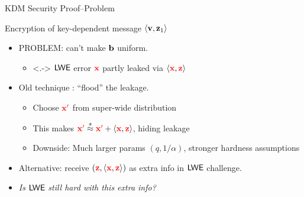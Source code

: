 \begin{frame}{KDM Security Proof--Problem}
  \begin{block}{Encryption of key-dependent message $\langle{\ensuremath{\mathbf{v}},
        \ensuremath{\mathbf{z}}_1}\rangle$}
        
        \begin{overlayarea}{\textwidth}{2cm}
     
    \smallskip

      \end{overlayarea}
  \end{block}
  \smallskip
  \begin{itemize}
  \item<1-> \alert{PROBLEM}: can't make $\mathbf{b}$ uniform.
    \begin{itemize}
    \item<.->
    $\textsf{LWE}$ error ${\color{red} \mathbf{x}}$ partly leaked via $\langle{\ensuremath{{\color{red} \mathbf{x}}},
      \ensuremath{{\color{red} \mathbf{z}}}}\rangle$
    \end{itemize}
  \item<2-> Old technique :
    ``flood'' the leakage.
    \begin{itemize}
    \item<2-> Choose ${\color{red} \mathbf{x}'}$ from super-wide distribution 
      \item<2-> This makes
      ${\color{red} \mathbf{x}'} \stackrel{s}{\approx} {\color{red} \mathbf{x}'}+\langle{\ensuremath{{\color{red} \mathbf{x}}},
        \ensuremath{{\color{red} \mathbf{z}}}}\rangle$, hiding leakage
    \item<2-> Downside: Much larger params $(q, 1/\alpha)$, stronger hardness
      assumptions
    \end{itemize}
  \item<3-> Alternative: receive $({\color{red} \mathbf{z}}, \langle{\ensuremath{{\color{red} \mathbf{x}}},
      \ensuremath{{\color{red} \mathbf{z}}}}\rangle)$ as extra info in $\textsf{LWE}$ challenge.
  \item<4->\textit{Is} $\textsf{LWE}$ \textit{still hard with this extra info?}
  \end{itemize}
\end{frame}
